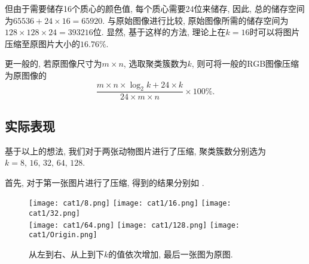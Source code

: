 \documentclass[lang=cn,11pt]{elegantpaper}
\begin{document}
但由于需要储存16个质心的颜色值, 每个质心需要24位来储存, 因此, 总的储存空间为$65536 + 24 \times 16 = 65920$. 与原始图像进行比较, 原始图像所需的储存空间为$128 \times 128 \times 24 = 393216$位. 显然, 基于这样的方法, 理论上在$k=16$时可以将图片压缩至原图片大小的$16.76\%$. 

更一般的, 若原图像尺寸为$m\times n$, 选取聚类簇数为$k$, 则可将一般的RGB图像压缩为原图像的$$\frac{m\times n \times \log_2k+24\times k}{24\times m\times n}\times 100\%.$$
\subsection{实际表现}
基于以上的想法, 我们对于两张动物图片进行了压缩, 聚类簇数分别选为$k=8,\,16,\,32,\,64,\,128$.

\noindent 首先, 对于第一张图片进行了压缩, 得到的结果分别如 .

\begin{figure}[ht]
    \centering
    \texttt{[image: cat1/8.png]}
    \texttt{[image: cat1/16.png]}
    \texttt{[image: cat1/32.png]}\\
    \texttt{[image: cat1/64.png]}
    \texttt{[image: cat1/128.png]}
    \texttt{[image: cat1/Origin.png]}
    \caption{从左到右、从上到下$k$的值依次增加, 最后一张图为原图. \label{fig:cat1}}
\end{figure}





\newpage
\nocite{*}



\end{document}
